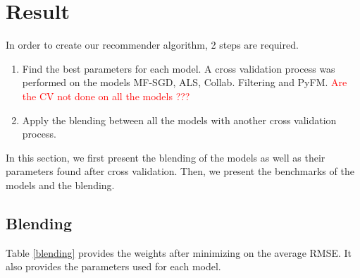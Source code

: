 \documentclass[10pt,conference,compsocconf]{IEEEtran}
\begin{document}
\section{Result}

In order to create our recommender algorithm, 2 steps are required. 
\begin{enumerate}
\item Find the best parameters for each model. A cross validation process was performed on the models MF-SGD, ALS, Collab. Filtering and PyFM. \textcolor{red}{Are the CV not done on all the models ???}
\item Apply the blending between all the models with another cross validation process.%
\end{enumerate}
In this section, we first present the blending of the models as well as their parameters found after cross validation. Then, we present the benchmarks of the models and the blending.

\subsection{Blending}

Table \ref{blending} provides the weights after minimizing on the average RMSE. It also provides the parameters used for each model.
\end{document}

